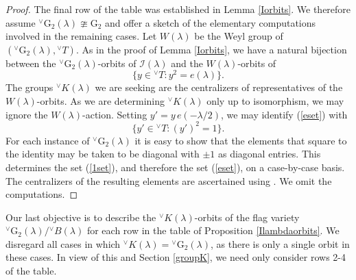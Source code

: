 \documentclass[a4paper, 11pt]{article}
\begin{document}
\begin{proof}
The final row of the table was established in Lemma \ref{Iorbits}.  We
therefore assume ${^\vee}\mathrm{G}_{2}(\lambda) \ncong
\mathrm{G}_{2}$ and offer a sketch of the elementary computations
involved in the remaining cases.
Let $W(\lambda)$ be the Weyl group of
$({^\vee}\mathrm{G}_{2}(\lambda), {^\vee}T)$.  As in the proof of
Lemma \ref{Iorbits}, we have a natural bijection between 
the ${^\vee}\mathrm{G}_{2}(\lambda)$-orbits of $\mathcal{I}(\lambda)$
and the $W(\lambda)$-orbits of
\begin{equation}
\label{eset}
\{y \in {^\vee}T : y^{2} = e(\lambda)\}.
\end{equation}
The groups ${^\vee}K(\lambda)$ we are seeking are the centralizers of
representatives of the $W(\lambda)$-orbits.  As we are determining
${^\vee}K(\lambda)$ only up to isomorphism, we may 
ignore the $W(\lambda)$-action.
Setting $y' = y \,e(-\lambda/2)$, we may
identify (\ref{eset}) with
\begin{equation}
\label{1set}
\{y' \in {^\vee}T : (y')^{2} = 1\}.
\end{equation}
For each instance of
${^\vee}\mathrm{G}_{2}(\lambda)$ it is easy to show that the elements
that square to the identity may be taken to be diagonal with $\pm 1$
as diagonal entries.  This determines the set (\ref{1set}), and
therefore the set (\ref{eset}), on a case-by-case basis.  The
centralizers of the resulting elements are ascertained using
\cite[Theorem 2.2 and Theorem 
  2.11]{HumphCC}.  We omit the computations. 
%
\end{proof}


Our last objective is to describe the ${^\vee}K(\lambda)$-orbits of
the  flag variety
${^\vee}\mathrm{G}_{2}(\lambda)/ {^\vee}B(\lambda)$ for each row in
the table of Proposition \ref{Ilambdaorbits}.   We disregard
all cases in which ${^\vee}K(\lambda) =
{^\vee}\mathrm{G}_{2}(\lambda)$, as there is only a single orbit in
these cases.   In view of this and Section
\ref{groupK}, we need only consider rows 2-4 of the table.
\end{document}
